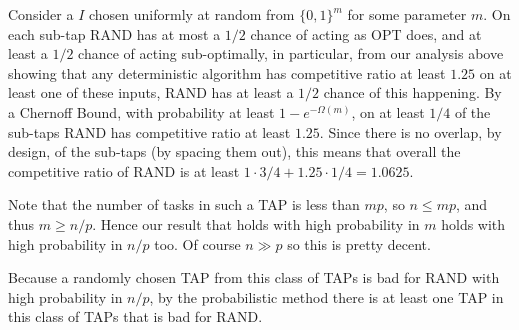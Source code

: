 Consider a $I$ chosen uniformly at random from $\{0,1\}^m$ for
some parameter $m$.
On each sub-tap RAND has at most a $1/2$ chance of acting as OPT
does, and at least a $1/2$ chance of acting sub-optimally, in
particular, from our analysis above showing that any deterministic
algorithm has competitive ratio at least $1.25$ on at least one
of these inputs, RAND has at least a $1/2$ chance of this
happening.
By a Chernoff Bound, with probability at least
$1-e^{-\Omega(m)}$, on at least $1/4$ of the sub-taps RAND has
competitive ratio at least $1.25$. Since there is no overlap, by
design, of the sub-taps (by spacing them out), this means that
overall the competitive ratio of RAND is at least $1\cdot 3/4 +
1.25 \cdot 1/4 = 1.0625.$

Note that the number of tasks in such a TAP is less than $mp$, so
$n \le mp$, and thus $m \ge n/p$.
Hence our result that holds with high probability in $m$ holds
with high probability in $n/p$ too.
Of course $n\gg p$ so this is pretty decent.

Because a randomly chosen TAP from this class of TAPs is bad for
RAND with high probability in $n/p$, by the probabilistic method
there is at least one TAP in this class of TAPs that is bad for
RAND. 


